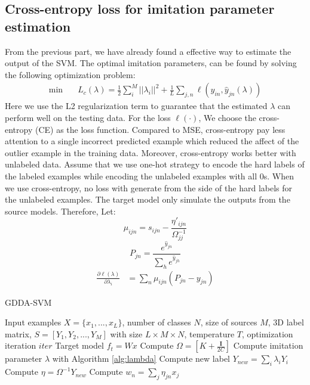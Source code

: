 \subsection{Cross-entropy loss for imitation parameter estimation}
From the previous part, we have already found a effective way to estimate the output of the SVM. The optimal imitation parameters, can be found by solving the following optimization problem:
\begin{equation}
\begin{aligned}
\min \quad& L_c\left(\lambda\right)=\frac{1}{2}\sum_i^M||\lambda_i||^2+\frac{1}{L}\sum_{j,n}\ell\left(y_{in},\hat{y}_{jn}\left(\lambda\right)\right)
\end{aligned}
\end{equation}
Here we use the L2 regularization term to guarantee that the estimated $\lambda$ can perform well on the testing data. For the loss $\ell(\cdot)$, We choose the cross-entropy (CE) as the loss function.
Compared to MSE, cross-entropy pay less attention to a single incorrect predicted example which reduced the affect of the outlier example in the training data. Moreover, cross-entropy works better with unlabeled data. Assume that we use one-hot strategy to encode the hard labels of the labeled examples while encoding the unlabeled examples with all 0s. When we use cross-entropy, no loss with generate from the side of the hard labels for the unlabeled examples. The target model only simulate the outputs from the source models. Therefore, 
Let:
\begin{equation}\label{eq:mu}
\mu_{ijn}=s_{ijn}-\frac{{\eta}'_{ijn}}{\Omega_{jj}^{-1}}
\end{equation}
\begin{equation}
P_{jn} = \frac{e^{\hat{y}_{jn}}}{\sum_{h} e^{\hat{y}_{jh}}}
\end{equation}
\begin{equation}\label{eq:p}
\begin{aligned}
\frac{\partial \ell(\lambda)}{\partial \lambda_i}&=\sum_n\mu_{ijn}\left(P_{jn}-{y}_{jn}\right)
\end{aligned}
\end{equation}

\begin{algorithm}
	\caption{GDDA-SVM}
	\begin{algorithmic}
		\Require Input examples $X=\{x_1,...,x_L\}$, number of classes $N$, size of sources $M$, 3D label matrix, $S=[Y_1,Y_2,...,Y_{M}]$ with size $L\times M \times N$, temperature $T$, optimization iteration $iter$
		\Ensure Target model $f_t = Wx$
		\State Compute $\Omega=[K+\frac{\mathbf{I}}{2C}]$
		\State Compute imitation parameter $\lambda$ with Algorithm \ref{alg:lambda}
		\State Compute new label $Y_{new}=\sum_i\lambda_iY_i$
		\State Compute $\eta = \Omega^{-1}Y_{new}$
		\State Compute $w_n = \sum_j \eta_{jn}x_j$
	\end{algorithmic}	
\end{algorithm}

